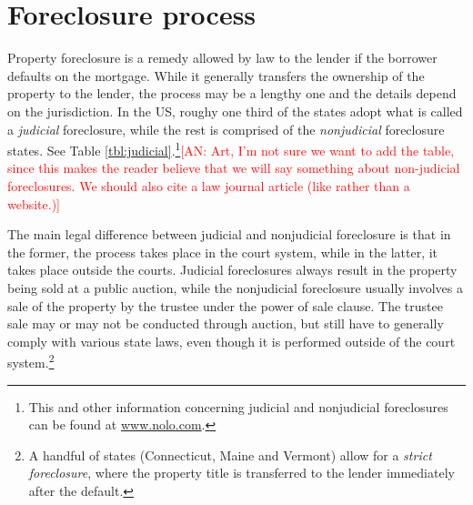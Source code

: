\documentclass[11pt,twopage]{article}
\newcommand{\AN}[1]{\textcolor{red}{[AN: #1]}}
\begin{document}
\section{Foreclosure process}
Property foreclosure is a remedy allowed by law to the lender if the borrower defaults on the mortgage. While it generally transfers the ownership of the property to the lender, the process may be a lengthy one and the details depend on the jurisdiction. In the US, roughy one third of the states adopt what is called a \emph{judicial} foreclosure, while the rest is comprised of the \emph{nonjudicial} foreclosure states. See Table \ref{tbl:judicial}.\footnote{This and other information concerning judicial and nonjudicial foreclosures can be found at \url{www.nolo.com}.}\AN{Art, I'm not sure we want to add the table, since this makes the reader believe that we will say something about non-judicial foreclosures. We should also cite a law journal article (like \cite{nelson2004reforming} rather than a website.)}

The main legal difference between judicial and nonjudicial foreclosure is that in the former, the process takes place in the court system, while in the latter, it takes place outside the courts. Judicial foreclosures always result in the property being sold at a public auction, while the nonjudicial foreclosure usually involves a sale of the property by the trustee under the power of sale clause. The trustee sale may or may not be conducted through auction, but still have to generally comply with various state laws, even though it is performed outside of the court system.\footnote{A handful of states (Connecticut, Maine and Vermont) allow for a \emph{strict foreclosure}, where the property title is transferred to the lender immediately after the default.} 
\end{document}
